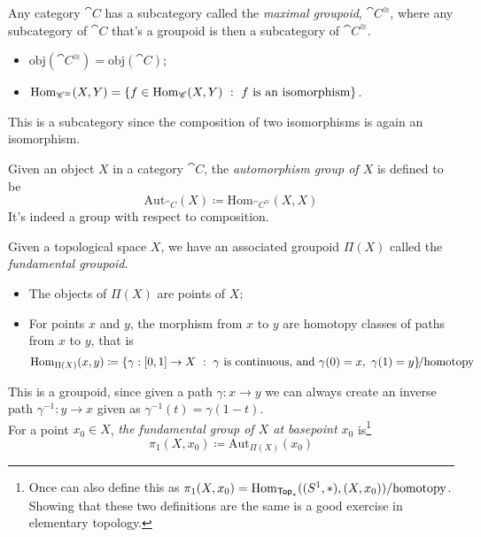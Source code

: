 \vspace*{0.1in}

\begin{example}
Any category $\cat{C}$ has a subcategory called the \emph{maximal groupoid}, $\cat{C}^{\cong}$, where any subcategory of $\cat{C}$ that's a groupoid is then a subcategory of $\cat{C}^{\cong}$.
\begin{itemize}
\item $\mathrm{obj}(\cat{C}^{\cong}) = \mathrm{obj}(\cat{C})$;
\item $\mathrm{Hom}_{\mathscr{C}^{\cong}}(X,Y) = \left\{f \in \mathrm{Hom}_{\mathscr{C}}(X,Y)\ :\ f \text{ is an isomorphism}\right\}$.
\end{itemize}
This is a subcategory since the composition of two isomorphisms is again an isomorphism.
\end{example}

\vspace*{0.1in}

\begin{remark}
Given an object $X$ in a category $\cat{C}$, the \emph{automorphism group of $X$} is defined to be
\[\mathrm{Aut}_{\cat{C}}(X) \coloneqq \mathrm{Hom}_{\cat{C}^{\cong}}(X,X)\]
It's indeed a group with respect to composition.
\end{remark}

\vspace*{0.1in}

\begin{example}\label{fundgrpd}
Given a topological space $X$, we have an associated groupoid $\Pi(X)$ called the \emph{fundamental groupoid}.
\begin{itemize}
\item The objects of $\Pi(X)$ are points of $X$;
\item For points $x$ and $y$, the morphism from $x$ to $y$ are homotopy classes of paths from $x$ to $y$, that is
\[\mathrm{Hom}_{\Pi(X)}(x,y) \coloneqq \left\{\gamma:[0,1] \to X\ :\ \gamma \text{ is continuous, and }\gamma(0) = x,\ \gamma(1) = y\right\}\!\!/\text{homotopy}\]
\end{itemize}
This is a groupoid, since given a path $\gamma:x \to y$ we can always create an inverse path $\gamma^{-1}: y \to x$ given as $\gamma^{-1}(t) = \gamma(1-t)$.\\[0.5em]
For a point $x_0 \in X$, \emph{the fundamental group of $X$ at basepoint $x_0$} is\footnote{Once can also define this as $\pi_1(X,x_0) = \mathrm{Hom}_{\mathsf{Top}_*}((S^1,*),(X,x_0))/\text{homotopy}$. Showing that these two definitions are the same is a good exercise in elementary topology.}
\[\pi_1(X,x_0) \coloneqq \mathrm{Aut}_{\Pi(X)}(x_0)\]
\end{example}

